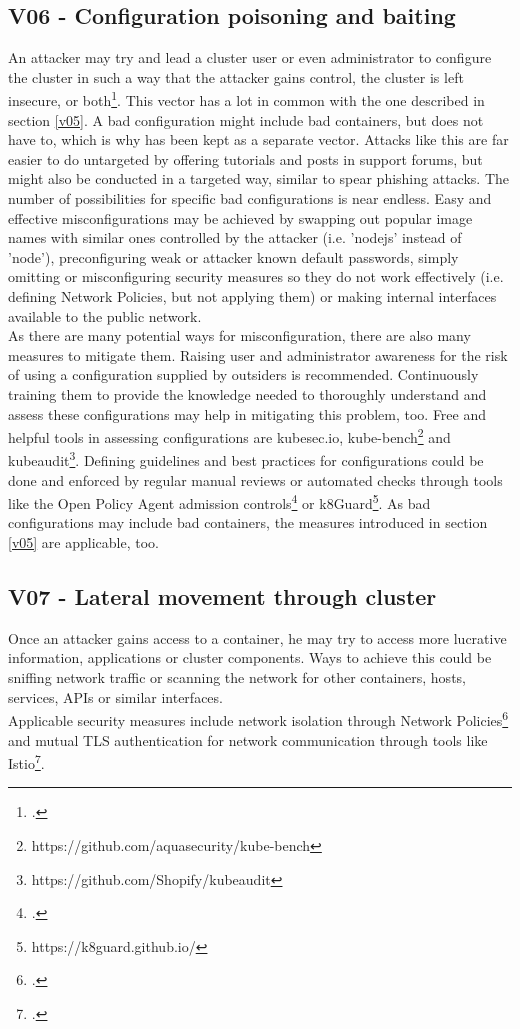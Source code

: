 \subsection{V06 - Configuration poisoning and baiting}
An attacker may try and lead a cluster user or even administrator to configure the cluster in such a way that the attacker gains control, the cluster is left insecure, or both\footcite[][, p. 13 to 14]{nistK8s}.
This vector has a lot in common with the one described in section \ref{v05}. A bad configuration might include bad containers, but does not have to, which is why has been kept as a separate vector. Attacks like this are far easier to do untargeted by offering tutorials and posts in support forums, but might also be conducted in a targeted way, similar to spear phishing attacks.
The number of possibilities for specific bad configurations is near endless. Easy and effective misconfigurations may be achieved by swapping out popular image names with similar ones controlled by the attacker (i.e. 'nodejs' instead of 'node'), preconfiguring weak or attacker known default passwords, simply omitting or misconfiguring security measures so they do not work effectively (i.e. defining Network Policies, but not applying them) or making internal interfaces available to the public network. \\
\newpage
As there are many potential ways for misconfiguration, there are also many measures to mitigate them.
Raising user and administrator awareness for the risk of using a configuration supplied by outsiders is recommended. Continuously training them to provide the knowledge needed to thoroughly understand and assess these configurations may help in mitigating this problem, too. 
Free and helpful tools in assessing configurations are kubesec.io, kube-bench\footnote{https://github.com/aquasecurity/kube-bench} and kubeaudit\footnote{https://github.com/Shopify/kubeaudit}.
Defining guidelines and best practices for configurations could be done and enforced by regular manual reviews or automated checks through tools like the Open Policy Agent admission controls\footcite[][, section 'Wrap Up']{opaAdmission} or k8Guard\footnote{https://k8guard.github.io/}.
As bad configurations may include bad containers, the measures introduced in section \ref{v05} are applicable, too.

\subsection{V07 - Lateral movement through cluster} \label{v07}
Once an attacker gains access to a container, he may try to access more lucrative information, applications or cluster components. Ways to achieve this could be sniffing network traffic or scanning the network for other containers, hosts, services, APIs or similar interfaces. \\
Applicable security measures include network isolation through Network Policies\footcite[][, section 'The NetworkPolicy Resource']{netPols} and mutual TLS authentication for network communication through tools like Istio\footcite[][, section 'Mutual TLS authentication']{istioMtls}.


